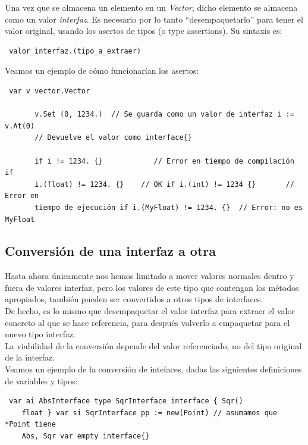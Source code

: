 	Una vez que se almacena un elemento en un \textit{Vector}, dicho elemento se
	almacena como un valor \textit{interfaz}. Es necesario por lo tanto
	``desempaquetarlo'' para tener el valor original, usando los asertos de
	tipos (o type assertions). Su sintaxis es:
	
	\begin{verbatim} valor_interfaz.(tipo_a_extraer) \end{verbatim}
	
	Veamos un ejemplo de cómo funcionarían los asertos:
	
	\begin{verbatim} var v vector.Vector
	   
	   v.Set (0, 1234.)  // Se guarda como un valor de interfaz i := v.At(0)
	   // Devuelve el valor como interface{}
	   
	   if i != 1234. {}            // Error en tiempo de compilación if
	   i.(float) != 1234. {}    // OK if i.(int) != 1234 {}       // Error en
	   tiempo de ejecución if i.(MyFloat) != 1234. {}  // Error: no es MyFloat
	   \end{verbatim}
	
	\subsection{Conversión de una interfaz a otra}
	
	Hasta ahora únicamente nos hemos limitado a mover valores normales dentro
	y fuera de valores interfaz, pero los valores de este tipo que contengan los
	métodos apropiados, también pueden ser convertidos a otros tipos de
	interfaces.\\
	
	De hecho, es lo mismo que desempaquetar el valor interfaz para extraer el
	valor concreto al que se hace referencia, para después volverlo a empaquetar
	para el nuevo tipo interfaz.\\
	
	La viabilidad de la conversión depende del valor referenciado, no del tipo
	original de la interfaz.\\
	
	Veamos un ejemplo de la conversión de intefaces, dadas las siguientes
	definiciones de variables y tipos:
	
	\begin{verbatim} var ai AbsInterface type SqrInterface interface { Sqr()
	float } var si SqrInterface pp := new(Point) // asumamos que *Point tiene
	Abs, Sqr var empty interface{} \end{verbatim}
	
